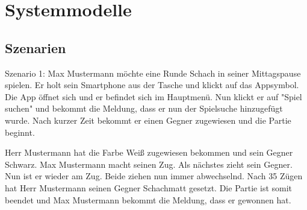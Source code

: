 \documentclass[parskip=full]{scrartcl}
\begin{document}
\section{Systemmodelle}
\subsection{Szenarien}
Szenario 1:
Max Mustermann möchte eine Runde Schach in seiner Mittagspause spielen. Er holt sein Smartphone aus der Tasche und klickt auf das Appsymbol.
Die App öffnet sich und er befindet sich im Hauptmenü. Nun klickt er auf "Spiel suchen" und bekommt die Meldung, dass er nun der Spielsuche hinzugefügt wurde.
Nach kurzer Zeit bekommt er einen Gegner zugewiesen und die Partie beginnt.

Herr Mustermann hat die Farbe Weiß zugewiesen bekommen und sein Gegner Schwarz.
Max Mustermann macht seinen Zug. Als nächstes zieht sein Gegner. Nun ist er wieder am Zug. Beide ziehen nun immer abwechselnd. Nach 35 Zügen hat Herr Mustermann
seinen Gegner Schachmatt gesetzt. Die Partie ist somit beendet und Max Mustermann bekommt die Meldung, dass er gewonnen hat.
\end{document}
